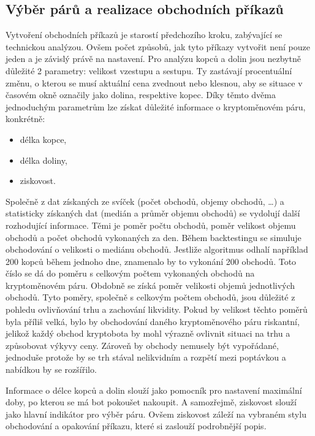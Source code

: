 \subsection{Výběr párů a realizace obchodních příkazů}
\label{subsec:trade-orders}
Vytvoření obchodních příkazů je starostí předchozího kroku, zabývající se technickou analýzou. Ovšem počet způsobů, jak tyto příkazy vytvořit není pouze jeden a je závislý právě na
nastavení. Pro analýzu kopců a dolin jsou nezbytně důležité 2 parametry: velikost vzestupu a sestupu. Ty zastávají procentuální změnu, o kterou se musí aktuální cena zvednout nebo klesnou,
aby se situace v časovém okně označily jako dolina, respektive kopec. Díky těmto dvěma jednoduchým parametrům lze získat důležité informace o kryptoměnovém páru, konkrétně:
\begin{itemize}
    \item délka kopce,
    \item délka doliny,
    \item ziskovost.
\end{itemize}
Společně z dat získaných ze svíček (počet obchodů, objemy obchodů, \ldots) a statisticky získaných dat (medián a průměr objemu obchodů) se vydolují další rozhodující informace.
Těmi je poměr počtu obchodů, poměr velikost objemu obchodů a počet obchodů vykonaných za den. Během backtestingu se simuluje obchodování o velikosti o mediánu obchodů. Jestliže
algoritmus odhalí například 200 kopců během jednoho dne, znamenalo by to vykonání 200 obchodů. Toto číslo se dá do poměru s celkovým počtem vykonaných obchodů na kryptoměnovém páru.
Obdobně se získá poměr velikosti objemů jednotlivých obchodů. Tyto poměry, společně s celkovým počtem obchodů, jsou důležité z pohledu ovlivňování trhu a zachování likvidity.
Pokud by velikost těchto poměrů byla příliš velká, bylo by obchodování daného kryptoměnového páru riskantní, jelikož každý obchod kryptobota by mohl výrazně ovlivnit situaci na trhu
a způsobovat výkyvy ceny. Zároveň by obchody nemusely být vypořádané, jednoduše protože by se trh stával nelikvidním a rozpětí mezi poptávkou a nabídkou by se rozšířilo.

Informace o délce kopců a dolin slouží jako pomocník pro nastavení maximální doby, po kterou se má bot pokoušet nakoupit. A samozřejmě, ziskovost slouží jako hlavní indikátor
pro výběr páru. Ovšem ziskovost záleží na vybraném stylu obchodování a opakování příkazu, které si zaslouží podrobnější popis.

